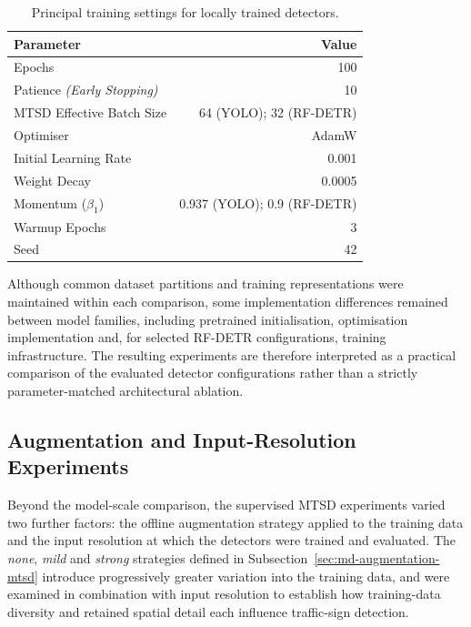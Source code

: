 \begin{table}[H]
\caption{Principal training settings for locally trained detectors.}
\label{tab:hyperparams}
\centering
\begin{tabular*}{\columnwidth}{@{\extracolsep{\fill}}lr@{}}
\toprule
\textbf{Parameter} & \textbf{Value} \\
\midrule
    Epochs & 100 \\
    Patience \textit{(Early Stopping)} & 10 \\
    MTSD Effective Batch Size & 64 (\gls{YOLO}); 32 (\gls{RF-DETR}) \\
    Optimiser & AdamW \\
    Initial Learning Rate & 0.001 \\
    Weight Decay & 0.0005 \\
    Momentum ($\beta_1$) & 0.937 (\gls{YOLO}); 0.9 (\gls{RF-DETR}) \\
    Warmup Epochs & 3 \\
    Seed & 42 \\
\bottomrule
\end{tabular*}
\end{table}

\noindent Although common dataset partitions and training representations were maintained within each comparison, some implementation differences remained between model families, including pretrained initialisation, optimisation implementation and, for selected \gls{RF-DETR} configurations, training infrastructure. The resulting experiments are therefore interpreted as a practical comparison of the evaluated detector configurations rather than a strictly parameter-matched architectural ablation.

\subsection{ Augmentation and Input-Resolution Experiments}
\label{subsec:mtsd-augmentation-resolution}
Beyond the model-scale comparison, the supervised \gls{MTSD} experiments varied two further factors: the offline augmentation strategy applied to the training data and the input resolution at which the detectors were trained and evaluated. The \emph{none}, \emph{mild} and \emph{strong} strategies defined in Subsection~\ref{sec:md-augmentation-mtsd} introduce progressively greater variation into the training data, and were examined in combination with input resolution to establish how training-data diversity and retained spatial detail each influence traffic-sign detection.

